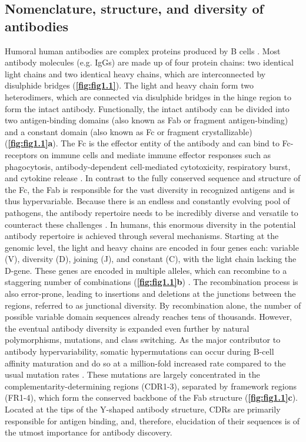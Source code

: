 \subsection{Nomenclature, structure, and diversity of antibodies}
Humoral human antibodies are complex proteins produced by B cells \cite{chiu2019antibody, schroeder2010structure}. Most antibody molecules (e.g. IgGs) are made up of four protein chains: two identical light chains and two identical heavy chains, which are interconnected by disulphide bridges (\textbf{\autoref{fig:fig1.1}}). The light and heavy chain form two heterodimers, which are connected via disulphide bridges in the hinge region to form the intact antibody. Functionally, the intact antibody can be divided into two antigen-binding domains (also known as Fab or fragment antigen-binding) and a constant domain (also known as Fc or fragment crystallizable) \cite{porter1959hydrolysis} (\textbf{\autoref{fig:fig1.1}a}). The Fc is the effector entity of the antibody and can bind to Fc-receptors on immune cells \cite{schroeder2010structure} and mediate immune effector responses such as phagocytosis, antibody-dependent cell-mediated cytotoxicity, respiratory burst, and cytokine release \cite{herr2003insights}. In contrast to the fully conserved sequence and structure of the Fc, the Fab is responsible for the vast diversity in recognized antigens and is thus hypervariable.
Because there is an endless and constantly evolving pool of pathogens, the antibody repertoire needs to be incredibly diverse and versatile to counteract these challenges \cite{charlesajaneway2001generation, alberts2002generation}. In humans, this enormous diversity in the potential antibody repertoire is achieved through several mechanisms. Starting at the genomic level, the light and heavy chains are encoded in four genes each: variable (V), diversity (D), joining (J), and constant (C), with the light chain lacking the D-gene. These genes are encoded in multiple alleles, which can recombine to a staggering number of combinations (\textbf{\autoref{fig:fig1.1}b}) \cite{jeske1984junctional}. The recombination process is also error-prone, leading to insertions and deletions at the junctions between the regions, referred to as junctional diversity. By recombination alone, the number of possible variable domain sequences already reaches tens of thousands. However, the eventual antibody diversity is expanded even further by natural polymorphisms, mutations, and class switching. As the major contributor to antibody hypervariability, somatic hypermutations can occur during B-cell affinity maturation and do so at a million-fold increased rate compared to the usual mutation rates \cite{schroederjr.2006similarity}. These mutations are largely concentrated in the complementarity-determining regions (CDR1-3), separated by framework regions (FR1-4), which form the conserved backbone of the Fab structure (\textbf{\autoref{fig:fig1.1}c}). Located at the tips of the Y-shaped antibody structure, CDRs are primarily responsible for antigen binding, and, therefore, elucidation of their sequences is of the utmost importance for antibody discovery.
